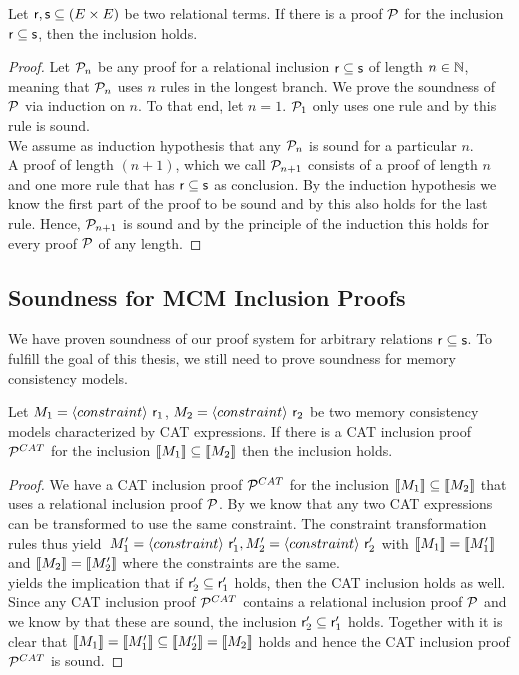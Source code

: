 \documentclass[a4paper,twoside,12pt, english]{article}
\begin{document}
\begin{theorem}[Soundness]\label{thm:soundness}
Let $\textsf{\upshape r}, \textsf{\upshape s} \subseteq (E\times E)$ be two relational terms. If there is a proof $\mathcal{P}$ for the inclusion $\textsf{\upshape r} \subseteq \textsf{\upshape s}$, then the inclusion holds.
\end{theorem}
\begin{proof}
Let $\mathcal{P}_n$ be any proof for a relational inclusion $\textsf{\upshape r} \subseteq \textsf{\upshape s}$ of length $n \in \mathbb{N}$, meaning that $\mathcal{P}_n$ uses $n$ rules in the longest branch. We prove the soundness of $\mathcal{P}$ via induction on $n$. To that end, let $n=1$. $\mathcal{P}_1$ only uses one rule and by  this rule is sound.\\
We assume as induction hypothesis that any $\mathcal{P}_n$ is sound for a particular $n$. \\
A proof of length $(n+1)$, which we call $\mathcal{P}_{n+1}$ consists of a proof of length $n$ and one more rule that has $\textsf{\upshape r} \subseteq \textsf{\upshape s}$ as conclusion. By the induction hypothesis we know the first part of the proof to be sound and by  this also holds for the last rule. 
Hence, $\mathcal{P}_{n+1}$ is sound and by the principle of the induction this holds for every proof $\mathcal{P}$ of any length.
\end{proof} 


\subsection{Soundness for MCM Inclusion Proofs}
We have proven soundness of our proof system for arbitrary relations $\textsf{\upshape r} \subseteq \textsf{\upshape s}$.
To fulfill the goal of this thesis, we still need to prove soundness for memory consistency models.
\begin{theorem}
Let $M_1 = \langle constraint \rangle~ \textsf{\upshape r}_1$, $M_2 = \langle constraint \rangle~ \textsf{\upshape r}_2$ be two memory consistency models characterized by CAT expressions. If there is a CAT inclusion proof $\mathcal{P}^{CAT}$ for the inclusion $\llbracket M_1 \rrbracket \subseteq \llbracket M_2 \rrbracket$ then the inclusion holds.
\end{theorem}
\begin{proof}
We have a CAT inclusion proof $\mathcal{P}^{CAT}$ for the inclusion $\llbracket M_1 \rrbracket \subseteq \llbracket M_2 \rrbracket$ that uses a relational inclusion proof $\mathcal{P}$. 
By  we know that any two CAT expressions can be transformed to use the same constraint. The constraint transformation rules thus yield~$M_1' = \langle constraint \rangle~ \textsf{\upshape r}_1', M_2' = \langle constraint \rangle~ \textsf{\upshape r}_2'$ with $\llbracket M_1 \rrbracket = \llbracket M_1' \rrbracket$ and $\llbracket M_2 \rrbracket = \llbracket M_2' \rrbracket$ where the constraints are the same. \\
 yields the implication that if $\textsf{\upshape r}_2' \subseteq \textsf{\upshape r}_1'$ holds, then the CAT inclusion holds as well. Since any CAT inclusion proof $\mathcal{P}^{CAT}$ contains a relational inclusion proof $\mathcal{P}$ and we know by  that these are sound, the inclusion $\textsf{\upshape r}_2' \subseteq \textsf{\upshape r}_1'$ holds. Together with  it is clear that $\llbracket M_1 \rrbracket = \llbracket M_1' \rrbracket \subseteq \llbracket M_2' \rrbracket = \llbracket M_2 \rrbracket$ holds and hence the CAT inclusion proof $\mathcal{P}^{CAT}$ is sound.
\end{proof}
\end{document}
